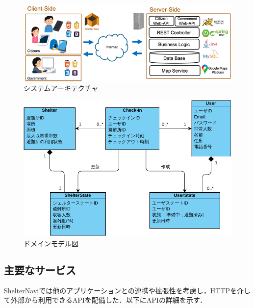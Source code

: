 \documentclass[technicalreport,dvipdfmx]{ieicej}
\begin{document}
\begin{figure}[htbp]
     \begin{center}
          \includegraphics[scale=0.35,pagebox=cropbox,clip]{img/architecture.png}
          \caption{システムアーキテクチャ}
          \label{fig:architecture}
     \end{center}
\end{figure}

\begin{figure}[htbp]
     \begin{center}
          \includegraphics[scale=0.5,pagebox=cropbox,clip]{img/domain_model.pdf}
          \caption{ドメインモデル図}
          \label{fig:domain}
     \end{center}
\end{figure}

\subsection{主要なサービス}
\label{sec:service}
ShelterNaviでは他のアプリケーションとの連携や拡張性を考慮し，HTTPを介して外部から利用できるAPIを配備した．以下にAPIの詳細を示す．
\end{document}
